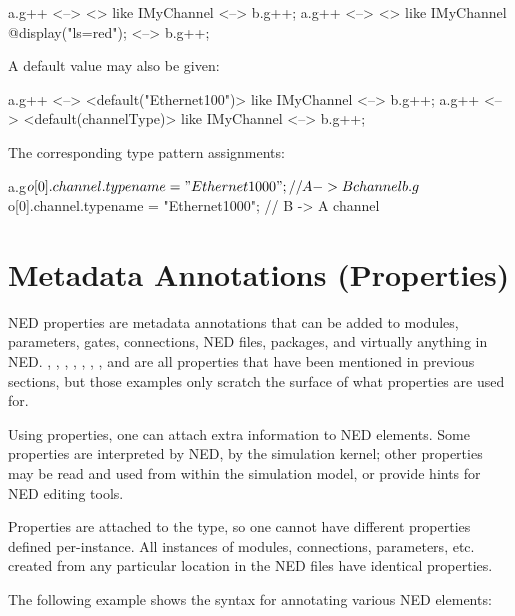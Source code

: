 \begin{ned}
a.g++ <--> <> like IMyChannel <--> b.g++;
a.g++ <--> <> like IMyChannel {@display("ls=red");} <--> b.g++;
\end{ned}

A default value may also be given:

\begin{ned}
a.g++ <--> <default("Ethernet100")> like IMyChannel <--> b.g++;
a.g++ <--> <default(channelType)> like IMyChannel <--> b.g++;
\end{ned}

The corresponding type pattern assignments:

\begin{ned}
a.g$o[0].channel.typename = "Ethernet1000";  // A -> B channel
b.g$o[0].channel.typename = "Ethernet1000";  // B -> A channel
\end{ned}


\section{Metadata Annotations (Properties)}
\label{sec:ned-lang:properties}

NED properties are metadata annotations that can be added to modules,
parameters, gates, connections, NED files, packages, and virtually anything in
NED. , , , ,
, , , and  are all properties
that have been mentioned in previous sections, but those examples only scratch
the surface of what properties are used for.


Using properties, one can attach extra information to NED elements. Some
properties are interpreted by NED, by the simulation kernel; other properties
may be read and used from within the simulation model, or provide hints for NED
editing tools.

Properties are attached to the type, so one cannot have different properties
defined per-instance. All instances of modules, connections, parameters, etc.
created from any particular location in the NED files have identical properties.

The following example shows the syntax for annotating various NED elements:


